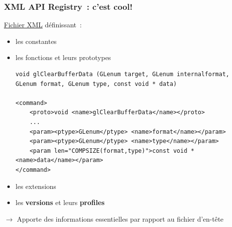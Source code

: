 \begin{frame}[fragile]
  \frametitle{XML API Registry~:  c'est cool!}
  \href{https://www.opengl.org/registry}{Fichier XML} définissant~: \\
  \begin{itemize}
    \item les constantes
    \item les fonctions et leurs prototypes \\
      {\tiny%
\begin{verbatim}
void glClearBufferData (GLenum target, GLenum internalformat, GLenum format, GLenum type, const void * data)

<command>
    <proto>void <name>glClearBufferData</name></proto>
    ...
    <param><ptype>GLenum</ptype> <name>format</name></param>
    <param><ptype>GLenum</ptype> <name>type</name></param>
    <param len="COMPSIZE(format,type)">const void *<name>data</name></param>
</command>
\end{verbatim}}
    \item les extensions
    \item les \textbf{versions} et leurs \textbf{profiles}
  \end{itemize}
  \centerline{\alert{$\longrightarrow$ Apporte des informations essentielles par rapport au fichier d'en-tête}}
\end{frame}

